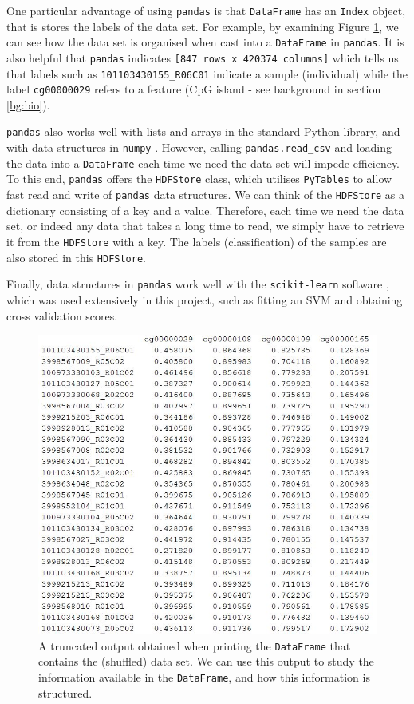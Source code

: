 \documentclass[12pt, twoside, a4paper]{report}
\begin{document}
One particular advantage of using \texttt{pandas} is that \texttt{DataFrame} has an \texttt{Index} object, that is stores the labels of the data set. For example, by examining Figure \ref{data:pandas:example}, we can see how the data set is organised when cast into a \texttt{DataFrame} in \texttt{pandas}. It is also helpful that \texttt{pandas} indicates \texttt{[847 rows x 420374 columns]} which tells us that labels such as \texttt{101103430155\_R06C01} indicate a sample (individual) while the label \texttt{cg00000029} refers to a feature (CpG island - see background in section \ref{bg:bio}).

\texttt{pandas} also works well with lists and arrays in the standard Python library, and with data structures in \texttt{numpy} \cite{RefWorks:214}. However, calling \texttt{pandas.read\_csv} and loading the data into a \texttt{DataFrame} each time we need the data set will impede efficiency. To this end, \texttt{pandas} offers the \texttt{HDFStore} class, which utilises \texttt{PyTables} \cite{pytables} to allow fast read and write of \texttt{pandas} data structures. We can think of the \texttt{HDFStore} as a dictionary consisting of a key and a value. Therefore, each time we need the data set, or indeed any data that takes a long time to read, we simply have to retrieve it from the \texttt{HDFStore} with a key. The labels (classification) of the samples are also stored in this \texttt{HDFStore}.

Finally, data structures in  \texttt{pandas} work well with the \texttt{scikit-learn} software \cite{scikit-learn}, which was used extensively in this project, such as fitting an SVM and obtaining cross validation scores.

\begin{figure}
\centering
\includegraphics[scale=0.9]{images/pandas-example.JPG}
\caption{A truncated output obtained when printing the \texttt{DataFrame} that contains the (shuffled) data set. We can use this output to study the information available in the \texttt{DataFrame}, and how this information is structured.}
\label{data:pandas:example}
\end{figure}
\end{document}
